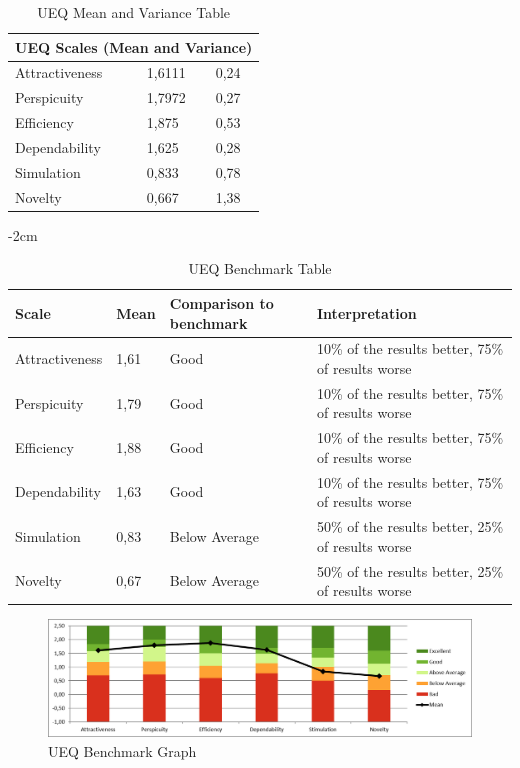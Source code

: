 \documentclass[a4,12pt]{article}
\begin{document}
\begin{table}[htb]
    \centering
    \begin{tabular}{l|l|l}
    \multicolumn{3}{l}{UEQ Scales (Mean and Variance)} \\ \hline
    Attractiveness        & 1,6111        & 0,24       \\
    Perspicuity           & 1,7972        & 0,27       \\
    Efficiency            & 1,875         & 0,53       \\
    Dependability         & 1,625         & 0,28       \\
    Simulation            & 0,833         & 0,78       \\
    Novelty               & 0,667         & 1,38
    \end{tabular}
    \caption{UEQ Mean and Variance Table}
\end{table}


\begin{table}[htb]
    \centering
    \addtolength{\leftskip} {-2cm}
    \addtolength{\rightskip}{-2cm}
    \begin{tabular}{l|l|l|l}
    Scale & Mean & Comparison to benchmark & Interpretation
    \\ \hline
    Attractiveness & 1,61 & Good                    & 10\% of the results better, 75\% of results worse \\
    Perspicuity    & 1,79 & Good                    & 10\% of the results better, 75\% of results worse \\
    Efficiency     & 1,88 & Good                    & 10\% of the results better, 75\% of results worse \\
    Dependability  & 1,63 & Good                    & 10\% of the results better, 75\% of results worse \\
    Simulation     & 0,83 & Below Average           & 50\% of the results better, 25\% of results worse \\
    Novelty        & 0,67 & Below Average           & 50\% of the results better, 25\% of results worse
    \end{tabular}
    \caption{UEQ Benchmark Table}
    \label{fig:UEQ_Benchmark_Table}
\end{table}

\begin{figure}[htb]
    \centering
    \includegraphics[scale=0.3]{public/results/UEQ_Benchmark_Graph.jpg}
    \caption{UEQ Benchmark Graph}
\end{figure}
\end{document}
